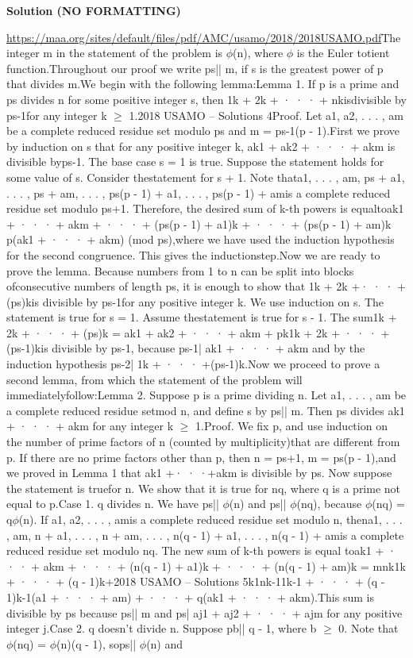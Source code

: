 \begin{enumerate}
\textbf{Solution (NO FORMATTING)}

\href{https://maa.org/sites/default/files/pdf/AMC/usamo/2018/2018USAMO.pdf}{https://maa.org/sites/default/files/pdf/AMC/usamo/2018/2018USAMO.pdf}The integer m in the statement of the problem is $\phi$(n), where $\phi$ is the Euler totient function.Throughout our proof we write ps|| m, if s is the greatest power of p that divides m.We begin with the following lemma:Lemma 1. If p is a prime and ps divides n for some positive integer s, then 1k + 2k + · · · + nkisdivisible by ps-1for any integer k $\geq$ 1.2018 USAMO – Solutions 4Proof. Let {a1, a2, . . . , am} be a complete reduced residue set modulo ps and m = ps-1(p - 1).First we prove by induction on s that for any positive integer k, ak1 + ak2 + · · · + akm is divisible byps-1. The base case s = 1 is true. Suppose the statement holds for some value of s. Consider thestatement for s + 1. Note that{a1, . . . , am, ps + a1, . . . , ps + am, . . . , ps(p - 1) + a1, . . . , ps(p - 1) + am}is a complete reduced residue set modulo ps+1. Therefore, the desired sum of k-th powers is equaltoak1 + · · · + akm + · · · + (ps(p - 1) + a1)k + · · · + (ps(p - 1) + am)k \equiv p(ak1 + · · · + akm)  (mod ps),where we have used the induction hypothesis for the second congruence. This gives the inductionstep.Now we are ready to prove the lemma. Because numbers from 1 to n can be split into blocks ofconsecutive numbers of length ps, it is enough to show that 1k + 2k +· · · + (ps)kis divisible by ps-1for any positive integer k. We use induction on s. The statement is true for s = 1. Assume thestatement is true for s - 1. The sum1k + 2k + · · · + (ps)k = ak1 + ak2 + · · · + akm + pk1k + 2k + · · · + (ps-1)kis divisible by ps-1, because ps-1| ak1 + · · · + akm and by the induction hypothesis ps-2| 1k + · · · +(ps-1)k.Now we proceed to prove a second lemma, from which the statement of the problem will immediatelyfollow:Lemma 2. Suppose p is a prime dividing n. Let {a1, . . . , am} be a complete reduced residue setmod n, and define s by ps|| m. Then ps divides ak1 + · · · + akm for any integer k $\geq$ 1.Proof. We fix p, and use induction on the number of prime factors of n (counted by multiplicity)that are different from p. If there are no prime factors other than p, then n = ps+1, m = ps(p - 1),and we proved in Lemma 1 that ak1 +· · ·+akm is divisible by ps. Now suppose the statement is truefor n. We show that it is true for nq, where q is a prime not equal to p.Case 1. q divides n. We have ps|| $\phi$(n) and ps|| $\phi$(nq), because $\phi$(nq) = q$\phi$(n). If {a1, a2, . . . , am}is a complete reduced residue set modulo n, then{a1, . . . , am, n + a1, . . . , n + am, . . . , n(q - 1) + a1, . . . , n(q - 1) + am}is a complete reduced residue set modulo nq. The new sum of k-th powers is equal toak1 + · · · + akm + · · · + (n(q - 1) + a1)k + · · · + (n(q - 1) + am)k = mnk1k + · · · + (q - 1)k+2018 USAMO – Solutions 5k1nk-11k-1 + · · · + (q - 1)k-1(a1 + · · · + am) + · · · + q(ak1 + · · · + akm).This sum is divisible by ps because ps|| m and ps| aj1 + aj2 + · · · + ajm for any positive integer j.Case 2. q doesn’t divide n. Suppose pb|| q - 1, where b $\geq$ 0. Note that $\phi$(nq) = $\phi$(n)(q - 1), sops|| $\phi$(n) and 
\end{enumerate}
